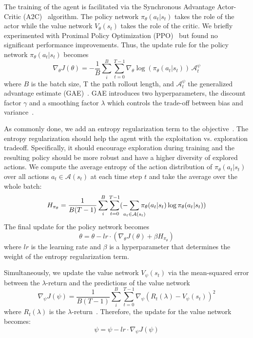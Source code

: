 The training of the agent is facilitated via the Synchronous Advantage Actor-Critic (A2C)~\cite{Mnih2016A2C} algorithm. The policy network $\pi_\theta(a_t | s_t)$ takes the role of the actor while the value network $V_\theta(s_t)$ takes the role of the critic. We briefly experimented with Proximal Policy Optimization (PPO)~\cite{Schulman2017PPO} but found no significant performance improvements. Thus, the update rule for the policy network $\pi_\theta(a_t | s_t)$ becomes
\begin{equation}
  \nabla_{\theta} J(\theta) = - \frac{1}{B} \sum_{i}^{B} \sum_{t=0}^{T-1} \nabla_{\theta} \log(\pi_{\theta} (a_t | s_t)) \, \mathcal{A}_{t}^{\psi}
\end{equation}
where $B$ is the batch size, T the path rollout length, and $\mathcal{A}_{t}^{\psi}$ the generalized advantage estimate (GAE)~\cite{Schulman2016GAE}. GAE introduces two hyperparameters, the discount factor $\gamma$ and a smoothing factor $\lambda$ which controls the trade-off between bias and variance~\cite{Schulman2016GAE, Sutton1998RL}.

As commonly done, we add an entropy regularization term to the objective~\cite{Das2018Minerva, Kaiser2021Reinforcement}. The entropy regularization should help the agent with the exploitation vs. exploration tradeoff. Specifically, it should encourage exploration during training and the resulting policy should be more robust and have a higher diversity of explored actions. We compute the average entropy of the action distribution of $\pi_{\theta}(a_t | s_t)$ over all actions $a_t \in \mathcal{A}(s_t)$ at each time step $t$ and take the average over the whole batch:
\begin{equation}
	H_{\pi_\theta} = \frac{1}{B(T-1)} \sum_{i}^{B} \sum_{t=0}^{T-1} (- \hspace{-0.3cm}\sum_{a_t \in \mathcal{A}(s_t)} \hspace{-0.3cm} \pi_\theta(a_t | s_t) \log \pi_\theta(a_t | s_t))
\end{equation}
The final update for the policy network becomes
\begin{equation}
  \theta = \theta - lr \cdot(\nabla_{\theta} J(\theta) + \beta H_{\pi_\theta})
\end{equation}
where $lr$ is the learning rate and $\beta$ is a hyperparameter that determines the weight of the entropy regularization term.

Simultaneously, we update the value network $V_{\psi}(s_t)$ via the mean-squared error between the $\lambda$-return and the predictions of the value network
\begin{equation}
		\nabla_{\psi} J(\psi)= \frac{1}{B (T-1)} \sum_{i}^{B} \sum_{t=0}^{T-1} \nabla_{\psi} (R_t(\lambda) - V_{\psi}(s_t))^2
\end{equation}
where $R_t(\lambda)$ is the $\lambda$-return~\cite{Sutton1998RL, Peng2018Mimic}. Therefore, the update for the value network becomes:
\begin{equation}
  \psi = \psi - lr \cdot \nabla_{\psi} J(\psi)
\end{equation}


